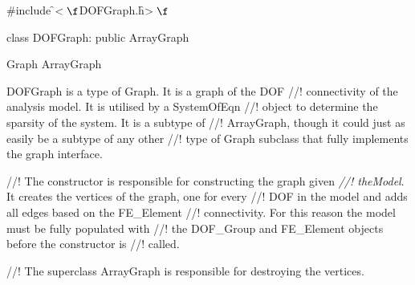 

\indent \#include \f$<\f$DOFGraph.h\f$>\f$

\indent class DOFGraph: public ArrayGraph

\indent Graph
\indent\indent ArrayGraph
\indent\indent{}

\indent DOFGraph is a type of Graph. It is a graph of the DOF
//! connectivity of the analysis model. It is utilised by a SystemOfEqn
//! object to determine the sparsity of the system. It is a subtype of
//! ArrayGraph, though it could just as easily be a subtype of any other
//! type of Graph subclass that fully implements the graph interface. 

//! The constructor is responsible for constructing the graph given {\em
//! theModel}. It creates the vertices of the graph, one for every
//! DOF in the model and adds all edges based on the FE\_Element
//! connectivity. For this reason the model must be fully populated with
//! the DOF\_Group and FE\_Element objects before the constructor is
//! called.

//! The superclass ArrayGraph is responsible for destroying the vertices.



